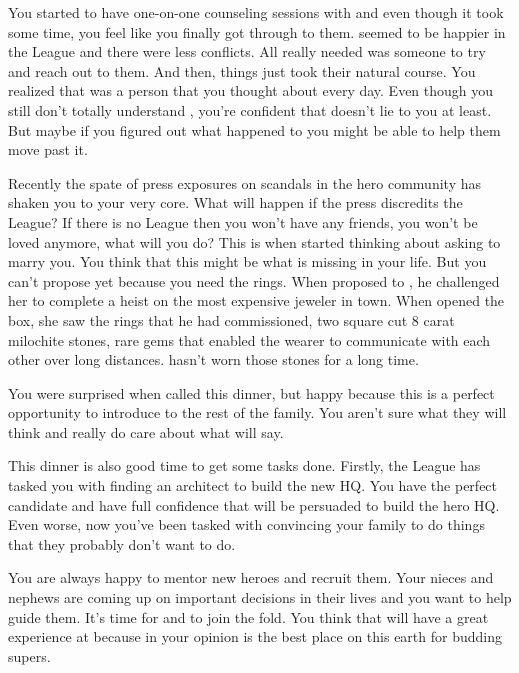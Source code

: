 \documentclass[char]{LRSguildcamp1}
\begin{document}
You started to have one-on-one counseling sessions with \cYS{} and even though it took some time, you feel like you finally got through to them. \cYS{} seemed to be happier in the League and there were less conflicts.  All\cYS{} really needed was someone to try and reach out to them. And then, things just took their natural course. You realized that \cYS{} was a person that you thought about every day. Even though you still don't totally understand  \cYS {\them}, you're confident that \cYS{} doesn't lie to you at least. But maybe if you figured out what happened to \cYS{} you might be able to help them move past it. 
 
Recently the spate of press exposures on scandals in the hero community has shaken you to your very core. What will happen if the press discredits the League? If there is no League then you won't have any friends, you won't be loved anymore, what will you do? This is when started thinking about asking \cYS{} to marry you. You think that this might be what is missing in your life. But you can't propose yet because you need the rings. When \cGS{} proposed to \cGrandma{}, he challenged her to complete a heist on the most expensive jeweler in town. When \cGrandma{} opened the box, she saw the rings that he had commissioned, two square cut 8 carat milochite stones, rare gems that enabled the wearer to communicate with each other over long distances.  \cGrandma{} hasn't worn those stones for a long time. 

You were surprised when \cGrandma{} called this dinner, but happy because this is a perfect opportunity to introduce \cYS{} to the rest of the family. You aren't sure what they will think and really do care about what \cGrandma{} will say. 

This dinner is also good time to get some tasks done. Firstly, the League has tasked you with finding an architect to build the new HQ. You have the perfect candidate and have full confidence that \cArchitect{} will be persuaded to build the hero HQ. Even worse, now you've been tasked with convincing your family to do things that they probably don't want to do. 

You are always happy to mentor new heroes and recruit them. Your nieces and nephews are coming up on important decisions in their lives and you want to help guide them. It's time for \cGrad{} and \cTeen{} to join the fold. You think that \cTween{} will have a great experience at \pSuperSchool{} because in your opinion \pSuperSchool{} is the best place on this earth for budding supers. 
\end{document}
